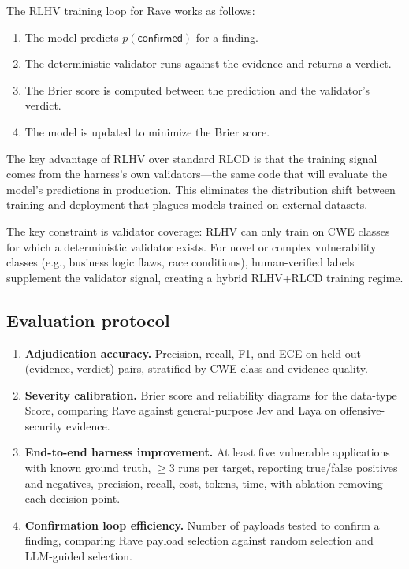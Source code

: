 \documentclass[conference]{IEEEtran}
\begin{document}
The RLHV training loop for Rave works as follows:

\begin{enumerate}[leftmargin=*]
\item The model predicts $p(\textsf{confirmed})$ for a finding.
\item The deterministic validator runs against the evidence and returns a verdict.
\item The Brier score is computed between the prediction and the validator's verdict.
\item The model is updated to minimize the Brier score.
\end{enumerate}

The key advantage of RLHV over standard RLCD is that the training signal comes from the harness's own validators---the same code that will evaluate the model's predictions in production. This eliminates the distribution shift between training and deployment that plagues models trained on external datasets.

The key constraint is validator coverage: RLHV can only train on CWE classes for which a deterministic validator exists. For novel or complex vulnerability classes (e.g., business logic flaws, race conditions), human-verified labels supplement the validator signal, creating a hybrid RLHV+RLCD training regime.

\subsection{Evaluation protocol}

\begin{enumerate}[leftmargin=*]
\item \textbf{Adjudication accuracy.} Precision, recall, F1, and ECE on held-out (evidence, verdict) pairs, stratified by CWE class and evidence quality.
\item \textbf{Severity calibration.} Brier score and reliability diagrams for the data-type Score, comparing Rave against general-purpose Jev and Laya on offensive-security evidence.
\item \textbf{End-to-end harness improvement.} At least five vulnerable applications with known ground truth, $\geq 3$ runs per target, reporting true/false positives and negatives, precision, recall, cost, tokens, time, with ablation removing each decision point.
\item \textbf{Confirmation loop efficiency.} Number of payloads tested to confirm a finding, comparing Rave payload selection against random selection and LLM-guided selection.
\end{enumerate}
\end{document}
